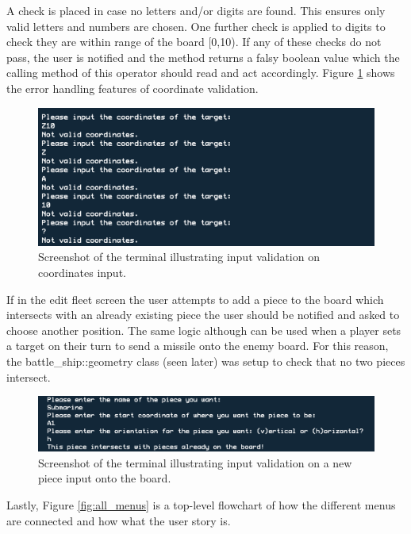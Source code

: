 \documentclass[11pt]{article} %
\begin{document}
A check is placed in case no letters and/or digits are found.
This ensures only valid letters and numbers are chosen.
One further check is applied to digits to check they are within range of the board [0,10).
If any of these checks do not pass, the user is notified and the method returns a falsy boolean
value which the calling method of this operator should read and act accordingly.
Figure \ref{fig:coordinate_validation} shows the error handling features of coordinate validation.
\begin{figure}[H]
\centering
\includegraphics[scale=0.6]{images/coordinate_validation.png}
\caption{Screenshot of the terminal illustrating input validation on coordinates input.}
\label{fig:coordinate_validation}
\end{figure}
If in the edit fleet screen the user attempts to add a piece to the board which intersects with an already existing piece
the user should be notified and asked to choose another position.
The same logic although can be used when a player sets a target on their turn to send a missile
onto the enemy board.
For this reason, the battle\_ship::geometry class (seen later) was setup to check that no two pieces intersect.
\begin{figure}[H]
\centering
\includegraphics[scale=0.6]{images/board_validation.png}
\caption{Screenshot of the terminal illustrating input validation on a new piece input onto the board.}
\label{fig:board_validation}
\end{figure}
Lastly, Figure \ref{fig:all_menus} is a top-level flowchart of how the different menus are connected and
how what the user story is.
\end{document}

